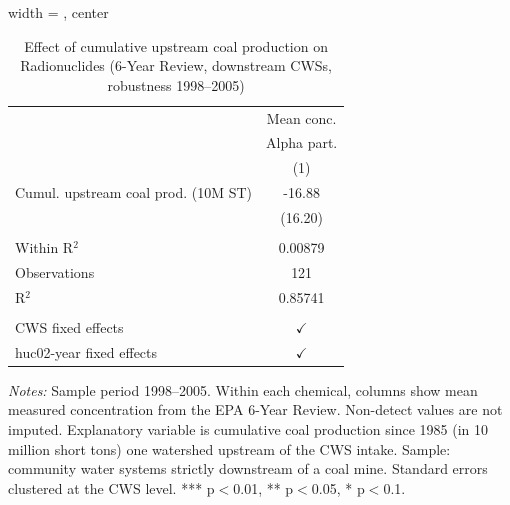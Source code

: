 
\begin{table}[htbp]
   
   \caption{\label{tab:6yr_huc02fe_radio_2005} Effect of cumulative upstream coal production on Radionuclides (6-Year Review, downstream CWSs, robustness 1998--2005)}
   \bigskip
   
   \centering
   
   \begin{adjustbox}{width = \textwidth, center}
      
      
      \begin{tabular}{lc}
         \toprule
         
                                             & Mean conc.\\  
         
                                             & Alpha part. \\   
         
                                             & (1)\\  
         
         \midrule 
         Cumul. upstream coal prod. (10M ST) & -16.88\\   
                                             & (16.20)\\   
         
          \\
         
         Within R$^2$                        & 0.00879\\  
         Observations                        & 121\\  
         R$^2$                               & 0.85741\\  
         
          \\
         
         CWS fixed effects                   & $\checkmark$\\   
         huc02-year fixed effects            & $\checkmark$\\   
         
         \bottomrule
         
      \end{tabular}
      
      
      
   \end{adjustbox}
      {\tiny\linespread{1}\selectfont \par \raggedright 
   \textit{Notes:} Sample period 1998--2005. Within each chemical, columns show mean measured concentration from the EPA 6-Year Review. Non-detect values are not imputed. Explanatory variable is cumulative coal production since 1985 (in 10 million short tons) one watershed upstream of the CWS intake. Sample: community water systems strictly downstream of a coal mine. Standard errors clustered at the CWS level. *** p$<$0.01, ** p$<$0.05, * p$<$0.1.}
   
\end{table}


